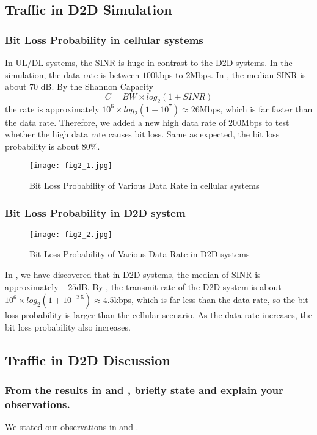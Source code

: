 \documentclass[conference]{IEEEtran}
\begin{document}
\subsection{Traffic in D2D Simulation}

\subsubsection{Bit Loss Probability in cellular systems}\label{subsub:uldl}
In UL/DL systems, the SINR is huge in contrast to the D2D systems. In the simulation, the data rate is between $100$kbps to $2$Mbps. In , the median SINR is about 70 dB. By the Shannon Capacity
\begin{equation} \label{eqn:shannon}
    C = BW \times log_2(1 + SINR)
\end{equation}
the rate is approximately $10^6 \times log_2(1+ 10^7) \approx 26$Mbps, which is far faster than the data rate. Therefore, we added a new high data rate of $200$Mbps to test whether the high data rate causes bit loss. Same as expected, the bit loss probability is about $80\%$.
\begin{figure}[htbp]
    \centering
    \texttt{[image: fig2\_1.jpg]}
    \caption{Bit Loss Probability of Various Data Rate in cellular systems}
    \label{fig:bit_uldl}
\end{figure}
\subsubsection{Bit Loss Probability in D2D system}\label{subsub:d2d}
\begin{figure}[htbp]
    \centering
    \texttt{[image: fig2\_2.jpg]}
    \caption{Bit Loss Probability of Various Data Rate in D2D systems}
    \label{fig:bit_d2d}
\end{figure}
In , we have discovered that in D2D systems, the median of SINR is approximately $-25$dB. By , the transmit rate of the D2D system is about $10^6 \times log_2(1+ 10^{-2.5}) \approx 4.5$kbps, which is far less than the data rate, so the bit loss probability is larger than the cellular scenario. As the data rate increases, the bit loss probability also increases.
\subsection{Traffic in D2D Discussion}
\subsubsection{From the results in  and , briefly state and explain your observations.}
We stated our observations in  and .
\end{document}
